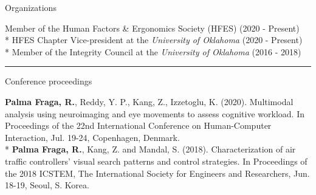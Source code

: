 \documentclass[a4paper,10pt]{article}
\newlength{\cvcolumngapwidth}
\newlength{\cvleftcolumnwidth}
\newlength{\cvrightcolumnwidth}
\newcommand{\cvsectionstyle}[1]{{\cvsectionfont\textcolor{cvsectioncolor}{#1}}}
\newcommand{\cvheadingstyle}[1]{{\normalsize\cvheadingfont\textcolor{cvheadingcolor}{#1}}}
\newlength{\cvafteritemskipamount}
\newlength{\cvaftersectionskipamount}
\newlength{\cvbetweensectionandheadingextraskipamount}
\newlength{\cvparskip}
\newcommand{\cvsection}[1]{
    \begin{minipage}[t]{\cvleftcolumnwidth}
        \raggedleft\cvsectionstyle{#1}
    \end{minipage}%
    \hspace{\cvcolumngapwidth}%
    \begin{minipage}[t]{\cvrightcolumnwidth}
        \textcolor{cvrulecolor}{\rule{\cvrightcolumnwidth}{0.3mm}}
    \end{minipage}

    \vspace{\cvaftersectionskipamount}
}
\newcommand{\cvitem}[2]{
    \begin{minipage}[t]{\cvleftcolumnwidth}
        \raggedleft #1
    \end{minipage}%
    \hspace{\cvcolumngapwidth}%
    \begin{minipage}[t]{\cvrightcolumnwidth}
        \setlength{\parskip}{\cvparskip} #2
    \end{minipage}

    \vspace{\cvafteritemskipamount}
}
\begin{document}
\cvitem{
    \cvheadingstyle{Organizations}
}{
Member of the Human Factors \& Ergonomics Society (HFES) \hfill{(2020 - Present)}
\\* HFES Chapter Vice-president at the \emph{University of Oklahoma} \hfill{(2020 - Present)}
\\* Member of the Integrity Council at the \emph{University of Oklahoma} \hfill{(2016 - 2018)}

}

\cvsection{PUBLICATIONS \& PRESENTATIONS}

\vspace{\cvbetweensectionandheadingextraskipamount}

\cvitem{
    \cvheadingstyle{Conference proceedings}
}{
    \textbf{Palma Fraga, R.}, Reddy, Y. P., Kang, Z., Izzetoglu, K. (2020). Multimodal analysis using neuroimaging and eye movements to assess cognitive workload. In Proceedings of the 22nd International Conference on Human-Computer Interaction, Jul. 19-24, Copenhagen, Denmark.
    \vspace{0.3cm}
    \\* \textbf{Palma Fraga, R.}, Kang, Z. and Mandal, S. (2018). Characterization of air traffic controllers’ visual search patterns and control strategies. In Proceedings of the 2018 ICSTEM, The International Society for Engineers and Researchers, Jun. 18-19, Seoul, S. Korea. 


}
\end{document}
